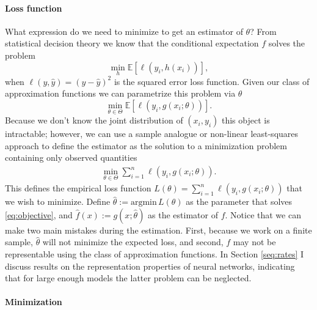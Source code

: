 \paragraph{Loss function}

What expression do we need to minimize to get an estimator of $\theta$? From statistical
decision theory we know that the conditional expectation $f$ solves the problem
\[
    \min_h \mathbb{E}\left[\ell\left(y_i, h(x_i)\right) \right],
\]
when $\ell(y, \hat{y}) = (y - \hat{y})^2$ is the squared error loss function. Given our
class of approximation functions we can parametrize this problem via $\theta$
\[
    \min_{\theta \in \Theta} \mathbb{E}\left[\ell\left(y_i, g(x_i; \theta)\right) \right].
\]
Because we don't know the joint distribution of $(x_i, y_i)$ this object is intractable;
however, we can use a sample analogue or non-linear least-squares approach to define
the estimator as the solution to a minimization problem containing only observed
quantities
\begin{align}
    \min_{\theta \in \Theta} \sum_{i = 1}^n \ell\left(y_i, g(x_i; \theta)\right).
    \tag{MP}
    \label{eq:objective}
\end{align}
This defines the empirical loss function $L(\theta) = \sum_{i = 1}^n \ell\left(y_i,
g(x_i; \theta)\right)$ that we wish to minimize. Define $\hat{\theta} := \text{argmin}
\, L(\theta)$ as the parameter that solves \ref{eq:objective}, and $\hat{f}(x) := g(x;
\hat{\theta})$ as the estimator of $f$. Notice that we can make two main mistakes during
the estimation. First, because we work on a finite sample, $\hat{\theta}$ will not
minimize the expected loss, and second, $f$ may not be representable using the class of
approximation functions. In Section \ref{seq:rates} I discuss results on the
representation properties of neural networks, indicating that for large enough models
the latter problem can be neglected.

\paragraph{Minimization}

